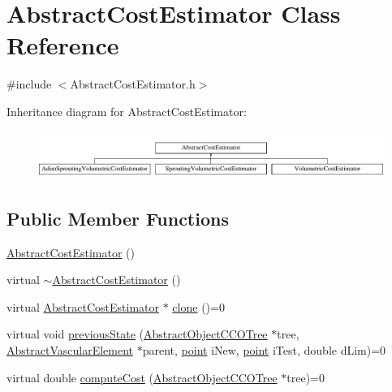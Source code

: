 \hypertarget{class_abstract_cost_estimator}{}\section{Abstract\+Cost\+Estimator Class Reference}
\label{class_abstract_cost_estimator}


{\ttfamily \#include $<$Abstract\+Cost\+Estimator.\+h$>$}

Inheritance diagram for Abstract\+Cost\+Estimator\+:\begin{figure}[H]
\begin{center}
\leavevmode
\includegraphics[height=1.568627cm]{db/d7c/class_abstract_cost_estimator}
\end{center}
\end{figure}
\subsection*{Public Member Functions}
\begin{DoxyCompactItemize}
\item 
\hyperlink{class_abstract_cost_estimator_af4ab3e04dbf4c41e10e084e069715973}{Abstract\+Cost\+Estimator} ()
\item 
virtual \hyperlink{class_abstract_cost_estimator_a96e75392a803041183a39eb3bb22b580}{$\sim$\+Abstract\+Cost\+Estimator} ()
\item 
virtual \hyperlink{class_abstract_cost_estimator}{Abstract\+Cost\+Estimator} $\ast$ \hyperlink{class_abstract_cost_estimator_a928e53418b17eb68c443e2a68fe5cbcf}{clone} ()=0
\item 
virtual void \hyperlink{class_abstract_cost_estimator_a8a806c3e4537c6d4acc428b029fd60de}{previous\+State} (\hyperlink{class_abstract_object_c_c_o_tree}{Abstract\+Object\+C\+C\+O\+Tree} $\ast$tree, \hyperlink{class_abstract_vascular_element}{Abstract\+Vascular\+Element} $\ast$parent, \hyperlink{structpoint}{point} i\+New, \hyperlink{structpoint}{point} i\+Test, double d\+Lim)=0
\item 
virtual double \hyperlink{class_abstract_cost_estimator_a2be0c6cc4aa6a73110c75ad903af428e}{compute\+Cost} (\hyperlink{class_abstract_object_c_c_o_tree}{Abstract\+Object\+C\+C\+O\+Tree} $\ast$tree)=0
\end{DoxyCompactItemize}


